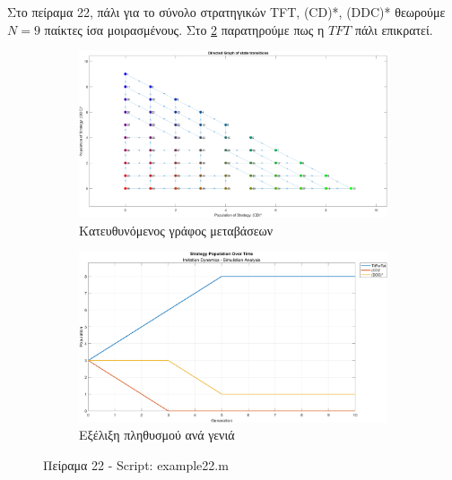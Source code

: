 \documentclass[12pt]{report}
\begin{document}
Στο πείραμα 22, πάλι για το σύνολο στρατηγικών \foreignlanguage{english}{TFT, (CD)*, (DDC)*} θεωρούμε $N=9$ παίκτες ίσα μοιρασμένους. Στο \ref{fig:fig22-sim} παρατηρούμε πως η $TFT$ πάλι επικρατεί.
\begin{figure}[H]
    \centering

    \begin{subfigure}[b]{0.45\textwidth}
        \includegraphics[width=\linewidth]{Figures Imitation Dynamics/example22.png}
        \caption{Κατευθυνόμενος γράφος μεταβάσεων}
        \label{fig:fig22}
    \end{subfigure}
    \hfill
    \begin{subfigure}[b]{0.45\textwidth}
        \includegraphics[width=\linewidth]{Figures Imitation Dynamics/example22-sim.png}
        \caption{Εξέλιξη πληθυσμού ανά γενιά}
        \label{fig:fig22-sim}
    \end{subfigure}

    \caption{Πείραμα 22 - \foreignlanguage{english}{Script: example22.m}}
    \label{fig:example22}
\end{figure}
\end{document}

